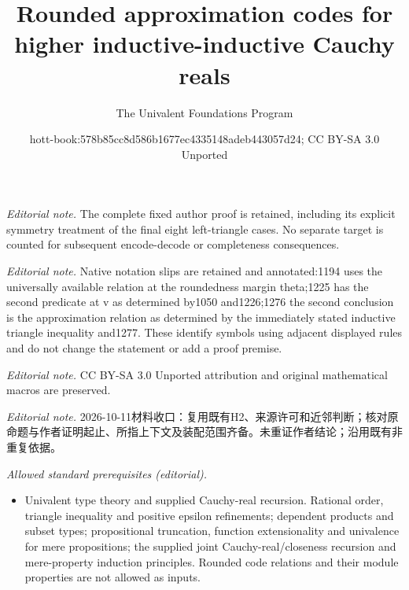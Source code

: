 \documentclass[10pt,a4paper]{article}
\title{Rounded approximation codes for higher inductive-inductive Cauchy reals}
\author{The Univalent Foundations Program}
\date{hott-book:578b85cc8d586b1677ec4335148adeb443057d24; CC BY-SA 3.0 Unported}
\newcounter{chapter}
\theoremstyle{definition}
\theoremstyle{remark}
\numberwithin{equation}{section}
\begin{document}
\maketitle
\setcounter{chapter}{11}
\setcounter{section}{3}
\setcounter{thm}{0}
\noindent\textit{Editorial note.} The complete fixed author proof is retained, including its explicit symmetry treatment of the final eight left-triangle cases. No separate target is counted for subsequent encode-decode or completeness consequences.\par\medskip
\noindent\textit{Editorial note.} Native notation slips are retained and annotated:1194 uses the universally available relation at the roundedness margin theta;1225 has the second predicate at v as determined by1050 and1226;1276 the second conclusion is the approximation relation as determined by the immediately stated inductive triangle inequality and1277. These identify symbols using adjacent displayed rules and do not change the statement or add a proof premise.\par\medskip
\noindent\textit{Editorial note.} CC BY-SA 3.0 Unported attribution and original mathematical macros are preserved.\par\medskip
\noindent\textit{Editorial note.} 2026-10-11材料收口：复用既有H2、来源许可和近邻判断；核对原命题与作者证明起止、所指上下文及装配范围齐备。未重证作者结论；沿用既有非重复依据。\par\medskip
\noindent\textit{Allowed standard prerequisites (editorial).}\begin{itemize}
\item Univalent type theory and supplied Cauchy-real recursion. Rational order, triangle inequality and positive epsilon refinements; dependent products and subset types; propositional truncation, function extensionality and univalence for mere propositions; the supplied joint Cauchy-real/closeness recursion and mere-property induction principles. Rounded code relations and their module properties are not allowed as inputs.
\end{itemize}\medskip
\end{document}
